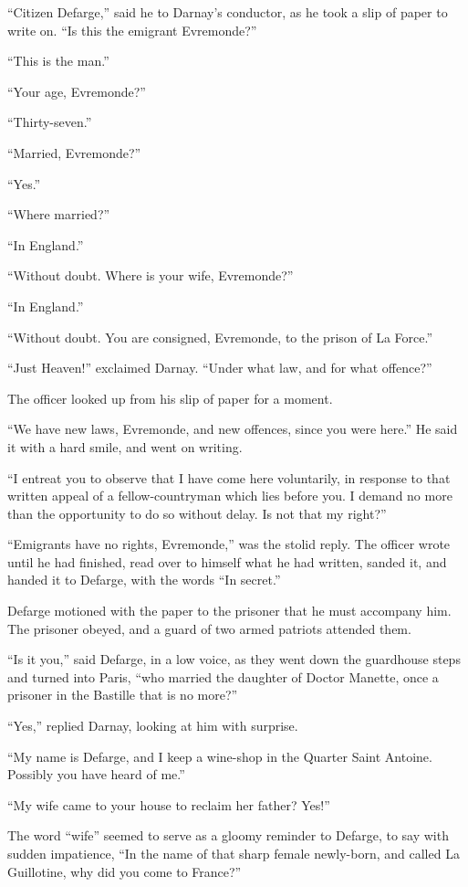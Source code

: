 ``Citizen Defarge,'' said he to Darnay's conductor, as he took a slip
of paper to write on.  ``Is this the emigrant Evremonde?''

``This is the man.''

``Your age, Evremonde?''

``Thirty-seven.''

``Married, Evremonde?''

``Yes.''

``Where married?''

``In England.''

``Without doubt.  Where is your wife, Evremonde?''

``In England.''

``Without doubt.  You are consigned, Evremonde, to the prison of La Force.''

``Just Heaven!'' exclaimed Darnay.  ``Under what law, and for what offence?''

The officer looked up from his slip of paper for a moment.

``We have new laws, Evremonde, and new offences, since you were here.''
He said it with a hard smile, and went on writing.

``I entreat you to observe that I have come here voluntarily, in response
to that written appeal of a fellow-countryman which lies before you.
I demand no more than the opportunity to do so without delay.
Is not that my right?''

``Emigrants have no rights, Evremonde,'' was the stolid reply.
The officer wrote until he had finished, read over to himself what he
had written, sanded it, and handed it to Defarge, with the words
``In secret.''

Defarge motioned with the paper to the prisoner that he must
accompany him.  The prisoner obeyed, and a guard of two armed
patriots attended them.

``Is it you,'' said Defarge, in a low voice, as they went down the
guardhouse steps and turned into Paris, ``who married the daughter of
Doctor Manette, once a prisoner in the Bastille that is no more?''

``Yes,'' replied Darnay, looking at him with surprise.

``My name is Defarge, and I keep a wine-shop in the Quarter Saint
Antoine.  Possibly you have heard of me.''

``My wife came to your house to reclaim her father?  Yes!''

The word ``wife'' seemed to serve as a gloomy reminder to Defarge,
to say with sudden impatience, ``In the name of that sharp female
newly-born, and called La Guillotine, why did you come to France?''

